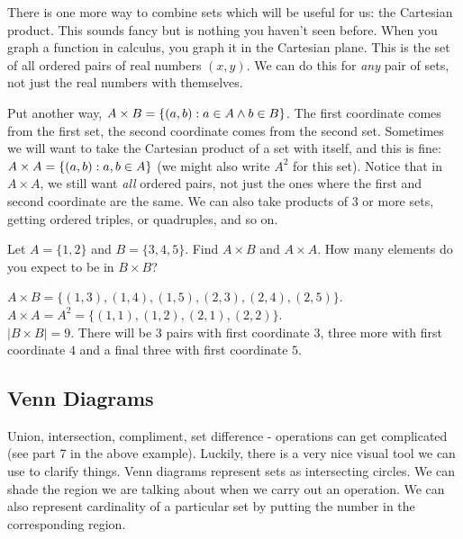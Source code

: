 \documentclass[12pt]{article}
\begin{document}
There is one more way to combine sets which will be useful for us: the Cartesian product.  This sounds fancy but is nothing you haven't seen before.  When you graph a function in calculus, you graph it in the Cartesian plane.  This is the set of all ordered pairs of real numbers $(x,y)$.  We can do this for \emph{any} pair of sets, not just the real numbers with themselves.

Put another way, $A \times B = \{(a,b) : a \in A \wedge b \in B\}$.  The first coordinate comes from the first set, the second coordinate comes from the second set.  Sometimes we will want to take the Cartesian product of a set with itself, and this is fine: $A \times A = \{(a,b) : a, b \in A\}$ (we might also write $A^2$ for this set).  Notice that in $A \times A$, we still want \emph{all} ordered pairs, not just the ones where the first and second coordinate are the same.  We can also take products of 3 or more sets, getting ordered triples, or quadruples, and so on.

\begin{example}
Let $A = \{1,2\}$ and $B = \{3,4,5\}$.  Find $A \times B$ and $A \times A$.  How many elements do you expect to be in $B \times B$?
\begin{solution}
$A \times B = \{(1,3), (1,4), (1,5), (2,3), (2,4), (2,5)\}$.  \\ $A \times A = A^2 = \{(1,1), (1,2), (2,1), (2,2)\}$. \\
$|B\times B| = 9$.  There will be 3 pairs with first coordinate $3$, three more with first coordinate $4$ and a final three with first coordinate $5$.
\end{solution}
\end{example}
%
%

\subsection{Venn Diagrams}
Union, intersection, compliment, set difference - operations can get complicated (see part 7 in the above example).  Luckily, there is a very nice visual tool we can use to clarify things.  Venn diagrams represent sets as intersecting circles.  We can shade the region we are talking about when we carry out an operation.  We can also represent cardinality of a particular set by putting the number in the corresponding region.\\
\end{document}
